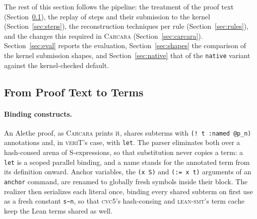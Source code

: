 \documentclass[runningheads]{llncs}
\newcommand{\cvcv}{\textsc{cvc5}\xspace}
\newcommand{\tactic}{\textsc{lean-smt}\xspace}
\newcommand{\carcara}{\textsc{Carcara}\xspace}
\newcommand{\verit}{\textsc{veriT}\xspace}
\newcommand{\alethe}{Alethe\xspace}
\begin{document}
The rest of this section follows the pipeline: the treatment of the proof
text (Section~\ref{sec:parsing}), the replay of steps and their submission
to the kernel (Section~\ref{sec:steps}), the reconstruction techniques per
rule (Section~\ref{sec:rules}), and the changes this required in \carcara
(Section~\ref{sec:carcara}). Section~\ref{sec:eval} reports the evaluation,
Section~\ref{sec:shapes} the comparison of the kernel submission shapes, and
Section~\ref{sec:native} that of the \texttt{native} variant against the
kernel-checked default.

\subsection{From Proof Text to Terms}
\label{sec:parsing}

\paragraph{Binding constructs.} An \alethe proof, as \carcara prints it,
shares subterms with \texttt{(! t :named @p\_n)} annotations and, in \verit's
case, with \texttt{let}. The parser eliminates both over a hash-consed arena
of S-expressions, so that substitution never copies a term: a \texttt{let}
is a scoped parallel binding, and a name stands for the annotated term from
its definition onward. Anchor variables, the \texttt{(x S)} and
\texttt{(:= x t)} arguments of an \texttt{anchor} command, are renamed to
globally fresh symbols inside their block. The realizer then serializes each
literal once, binding every shared subterm on first use as a fresh constant
\texttt{s\textasciitilde{}n}, so that \cvcv's hash-consing and \tactic's term
cache keep the Lean terms shared as well.
\end{document}
